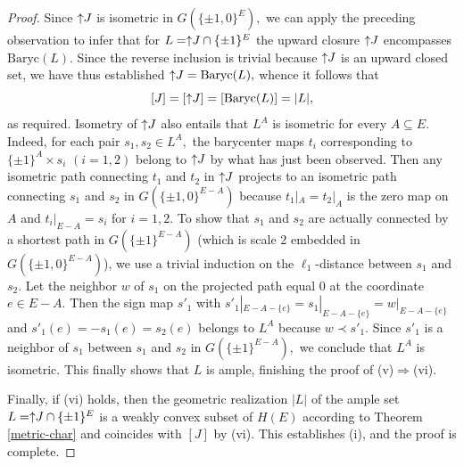 \documentclass[11pt,a4paper]{amsart}
\theoremstyle{definition}
\numberwithin{equation}{section}
\newcommand{\covectors}{\ensuremath{L}}
\newcommand{\HH}{\ensuremath{H}}
\newcommand{\hcovectors}{J}
\begin{document}
\begin{proof}
Since $\uparrow\hspace*{-0.1cm}\hcovectors$ is isometric in $G(\{ \pm 1,0\}^E),$ we can apply the preceding observation to infer that for $\covectors=\uparrow\hspace*{-0.1cm}\hcovectors\cap \{ \pm 1\}^E$ the upward closure $\uparrow\hspace*{-0.1cm}\hcovectors$ encompasses $\mbox{Baryc}(\covectors).$ Since the reverse inclusion is trivial because $\uparrow\hspace*{-0.1cm}\hcovectors$ is  an upward closed set, we have thus established $\uparrow\hspace*{-0.1cm}\hcovectors=\mbox{Baryc}(\covectors),$ whence it follows that
$$[\hcovectors]=[\uparrow\hspace*{-0.1cm}\hcovectors]=[\mbox{Baryc}(\covectors)]=|\covectors|,$$
as required. Isometry of $\uparrow\hspace*{-0.1cm}\hcovectors$ also entails that ${\covectors}^A$ is isometric for every $A\subseteq E.$ Indeed, for each pair $s_1,s_2\in \covectors^A,$ the barycenter maps $t_i$ corresponding to $\{ \pm 1\}^A\times s_i$ $(i=1,2)$ belong to $\uparrow\hspace*{-0.1cm}\hcovectors$ by what has just been observed. Then any isometric path connecting $t_1$ and $t_2$ in $\uparrow\hspace*{-0.1cm}\hcovectors$ projects to an isometric path connecting $s_1$ and $s_2$ in $G(\{ \pm 1,0\}^{E-A})$ because $t_1|_A=t_2|_A$ is the zero map on $A$ and $t_i|_{E-A}=s_i$ for $i=1,2.$ To show that $s_1$ and $s_2$ are actually connected by a shortest path in $G(\{ \pm 1\}^{E-A})$ (which is scale 2 embedded in $G(\{ \pm 1,0\}^{E-A})$), we use a trivial induction on the $\ell_1$-distance between $s_1$ and $s_2$. Let the neighbor $w$ of $s_1$ on the projected path equal $0$ at the coordinate $e\in E-A.$ Then the sign map $s'_1$ with
$s'_1|_{E-A-\{ e\}}=s_1|_{E-A-\{ e\}}=w|_{E-A-\{ e\}}$ and $s'_1(e)=-s_1(e)=s_2(e)$ belongs to $\covectors^A$ because $w\prec s'_1.$ Since $s'_1$ is a neighbor of $s_1$ between $s_1$ and $s_2$ in $G(\{ \pm 1\}^{E-A}),$ we conclude that $\covectors^A$ is isometric. This finally shows that $\covectors$ is ample, finishing the proof of (v)$\Rightarrow$(vi).

Finally, if (vi) holds, then the geometric realization $|\covectors|$ of the ample set $\covectors=\uparrow\hspace*{-0.1cm}\hcovectors\cap \{ \pm 1\}^E$ is a weakly convex subset of $\HH(E)$ according to Theorem \ref{metric-char} and coincides with $[\hcovectors]$ by (vi). This establishes (i), and the proof is complete.
\end{proof}
\end{document}
